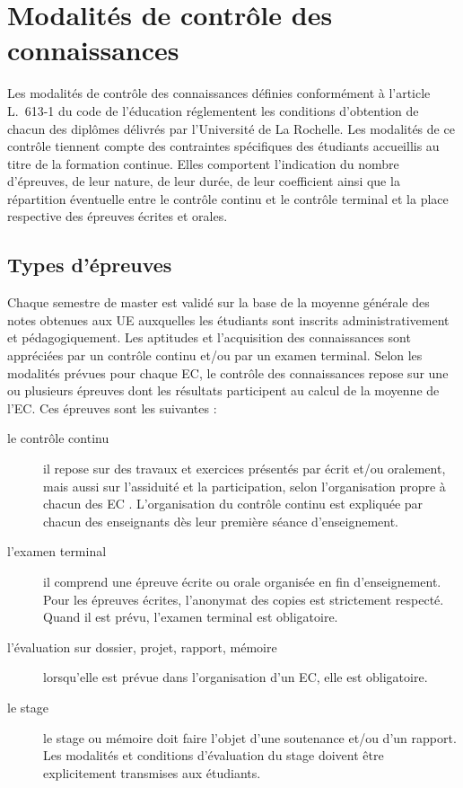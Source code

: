 \documentclass[a4paper,11pt]{article}
\begin{document}
\section{Modalités de contrôle des connaissances}
Les modalités de contrôle des connaissances définies conformément à l'article L.~613-1 du code de l'éducation réglementent les conditions d'obtention de chacun des diplômes délivrés par l'Université de La Rochelle. Les modalités de ce contrôle tiennent compte des contraintes spécifiques des étudiants accueillis au titre de la formation continue. Elles comportent l'indication du nombre d'épreuves, de leur nature, de leur durée, de leur coefficient ainsi que la répartition éventuelle entre le contrôle continu et le contrôle terminal et la place respective des épreuves écrites et orales.

\subsection{Types d'épreuves}
Chaque semestre de master est validé sur la base de la moyenne générale des notes obtenues aux UE auxquelles les étudiants sont inscrits administrativement et pédagogiquement.
Les aptitudes et l'acquisition des connaissances sont appréciées par un contrôle continu et/ou par un examen terminal.
Selon les modalités prévues pour chaque EC, le contrôle des connaissances repose sur une ou plusieurs épreuves dont les résultats participent au calcul de la moyenne de l'EC. Ces épreuves sont les suivantes :
\begin{description}
	\item[le contrôle continu] il repose sur des travaux et exercices présentés par écrit et/ou oralement, mais aussi sur l'assiduité et la participation, selon l'organisation propre à chacun des EC . L'organisation du contrôle continu est expliquée par chacun des enseignants dès leur première séance d'enseignement.
	\item[l'examen terminal] il comprend une épreuve écrite ou orale organisée en fin d'enseignement. Pour les épreuves écrites, l'anonymat des copies est strictement respecté. Quand il est prévu, l'examen terminal est obligatoire.
	\item[l'évaluation sur dossier, projet, rapport, mémoire] lorsqu'elle est prévue dans l'organisation d'un EC, elle est obligatoire.
	\item[le stage] le stage ou mémoire doit faire l'objet d'une soutenance et/ou d'un rapport. Les modalités et conditions d'évaluation du stage doivent être explicitement transmises aux étudiants.
\end{description}
\end{document}
